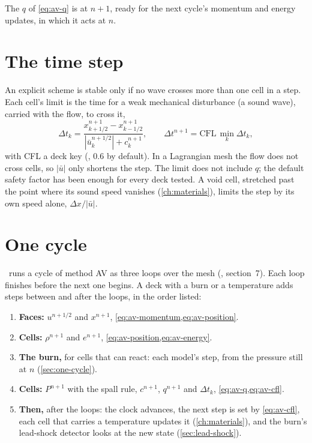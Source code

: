 The $q$ of \cref{eq:av-q} is at $n + 1$, ready for the next cycle's
momentum and energy updates, in which it acts at $n$.

\section{The time step}
\label{sec:av-dt}

An explicit scheme is stable only if no wave crosses more than one cell in
a step. Each cell's limit is the time for a weak mechanical disturbance (a
sound wave), carried with the flow, to cross it,
\begin{equation}
\Delta t_k = \frac{x^{n+1}_{k+1/2} - x^{n+1}_{k-1/2}}{|\bar u^{n+1/2}_k| + c^{n+1}_k},
\qquad
\Delta t^{n+1} = \mathrm{CFL}\,\min_k \Delta t_k ,
\label{eq:av-cfl}
\end{equation}
with CFL a deck key (, 0.6 by default). In a Lagrangian mesh the
flow does not cross cells, so $|\bar u|$ only shortens the step. The
limit does not include $q$; the default safety factor has been enough for
every deck tested.
A void cell, stretched past the point where its sound speed vanishes
(\cref{ch:materials}), limits the step by its own speed alone,
$\Delta x/|\bar u|$.

\section{One cycle}
\label{sec:av-cycle}

\bw\ runs a cycle of method AV as three loops over the mesh
(, section~7). Each loop finishes before the next one
begins. A deck with a burn or a temperature adds steps between and after
the loops, in the order listed:

\begin{enumerate}
\item \textbf{Faces:} $u^{n+1/2}$ and $x^{n+1}$, \cref{eq:av-momentum,eq:av-position}.
\item \textbf{Cells:} $\rho^{n+1}$ and $e^{n+1}$, \cref{eq:av-position,eq:av-energy}.
\item \textbf{The burn,} for cells that can react: each model's step,
  from the pressure still at $n$ (\cref{sec:one-cycle}).
\item \textbf{Cells:} $P^{n+1}$ with the spall rule, $c^{n+1}$, $q^{n+1}$
  and $\Delta t_k$, \cref{eq:av-q,eq:av-cfl}.
\item \textbf{Then,} after the loops: the clock advances, the next step
  is set by \cref{eq:av-cfl}, each cell that carries a temperature updates
  it (\cref{ch:materials}), and the burn's lead-shock detector looks at the
  new state (\cref{sec:lead-shock}).
\end{enumerate}

